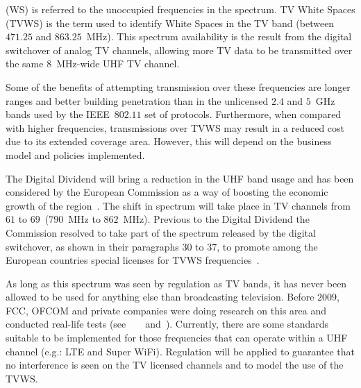  (WS) is referred to the unoccupied frequencies in the spectrum. TV White Spaces (TVWS) is the term used to identify White Spaces in the TV band (between $471.25$ and $863.25$~MHz). This spectrum availability is the result from the digital switchover of analog TV channels, allowing more TV data to be transmitted over the same $8$~MHz-wide UHF TV channel.

Some of the benefits of attempting transmission over these frequencies are longer ranges and better building penetration than in the unlicensed $2.4$ and $5$~GHz bands used by the IEEE~$802.11$ set of protocols. Furthermore, when compared with higher frequencies, transmissions over TVWS may result in a reduced cost due to its extended coverage area. However, this will depend on the business model and policies implemented.

The Digital Dividend will bring a reduction in the UHF band usage and has been considered by the European Commission as a way of boosting the economic growth of the region~\cite{digitalDividend}. The shift in spectrum will take place in TV channels from $61$ to $69$~($790$~MHz to $862$~MHz). Previous to the Digital Dividend the Commission resolved to take part of the spectrum released by the digital switchover, as shown in their paragraphs 30 to 37, to promote among the European countries special licenses for TVWS frequencies~\cite{spectrumShift}.

% 

As long as this spectrum was seen by regulation as TV bands, it has never been allowed to be used for anything else than broadcasting television. Before $2009$, FCC, OFCOM and private companies were doing research on this area and conducted real-life tests (see~\cite{chandra2011campus}~\cite{davies2011field}~\cite{dvbtSensing}~and~\cite{digitalDividendCognitiveAccess}). Currently, there are some standards suitable to be implemented for those frequencies that can operate within a UHF channel (e.g.: LTE and Super WiFi). Regulation will be applied to guarantee that no interference is seen on the TV licensed channels and to model the use of the TVWS.

